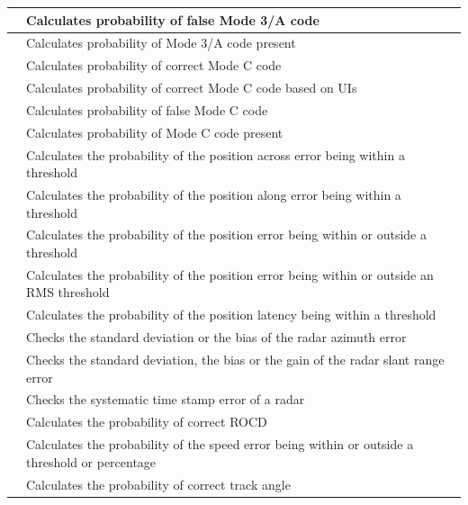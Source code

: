 \begin{center}
\begin{table}[H]
\begin{tabularx}{\textwidth}{ | l | X |  }
    \nameref{sec:eval_req_m3a_false} & Calculates probability of false Mode 3/A code \\ \hline
    \nameref{sec:eval_req_m3a_present} & Calculates probability of Mode 3/A code present \\ \hline
    \nameref{sec:eval_req_mc_correct} & Calculates probability of correct Mode C code \\ \hline
    \nameref{sec:eval_req_mc_correct_periods} & Calculates probability of correct Mode C code based on UIs \\ \hline
    \nameref{sec:eval_req_mc_false} & Calculates probability of false Mode C code \\ \hline
    \nameref{sec:eval_req_mc_present} & Calculates probability of Mode C code present \\ \hline
    \nameref{sec:eval_req_pos_across} & Calculates the probability of the position across error being within a threshold \\ \hline
    \nameref{sec:eval_req_pos_along} & Calculates the probability of the position along error being within a threshold \\ \hline
    \nameref{sec:eval_req_pos_distance} & Calculates the probability of the position error being within or outside a threshold \\ \hline
    \nameref{sec:eval_req_pos_distance_rms} & Calculates the probability of the position error being within or outside an RMS threshold \\ \hline
    \nameref{sec:eval_req_pos_latency}  & Calculates the probability of the position latency being within a threshold \\ \hline
    \nameref{sec:eval_req_pos_radar_azm} & Checks the standard deviation or the bias of the radar azimuth error \\ \hline
    \nameref{sec:eval_req_pos_radar_rng} & Checks the standard deviation, the bias or the gain of the radar slant range error \\ \hline
    \nameref{sec:eval_req_pos_radar_tse} & Checks the systematic time stamp error of a radar \\ \hline
    \nameref{sec:eval_req_rocd_correct} & Calculates the probability of correct ROCD \\ \hline
    \nameref{sec:eval_req_speed} & Calculates the probability of the speed error being within or outside a threshold or percentage \\ \hline
    \nameref{sec:eval_req_track_angle} & Calculates the probability of correct track angle \\ \hline
\end{tabularx}
\end{table}
\end{center}
\ \\

